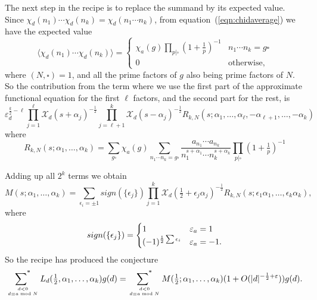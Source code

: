 \documentclass[12pt,letterpaper]{amsart}
\theoremstyle{plain}
\theoremstyle{definition}
\theoremstyle{remark}
\numberwithin{equation}{subsection}
\numberwithin{theorem}{subsection}
\numberwithin{table}{subsection}
\newcommand{\ontop}[2]{\genfrac{}{}{0pt}{}{#1}{#2}}
\def\sumstar{\operatornamewithlimits{\sum\nolimits^*}}
\begin{document}
The next step in the recipe is to replace the
summand by its expected value.  Since 
$\chi_d(n_1)\cdots \chi_d(n_k) = \chi_d(n_1\cdots n_k)$,
from equation~(\ref{eqn:chidaverage}) we have
the expected value
\begin{equation}
\langle\chi_d(n_1)\cdots \chi_d(n_k)\rangle=
\begin{cases}
    \chi_a(g) \prod_{p|\square}  (1+\frac1p)^{-1} & n_1\cdots n_k=g \square  \\
    0 & \text{otherwise},
\end{cases}
\end{equation}
where $(N,\square)=1$, and all the prime factors of $g$ also being
prime factors of $N$.
So the contribution from the term where we use the first part of the
approximate functional equation for the first $\ell$ factors,
and the second part for the rest, is
\begin{equation}
\varepsilon_d^{\frac{k}{2}-\ell}
\prod_{j=1}^\ell \mathcal{X}_d(s +\alpha_j)^{-\frac12}
\prod_{j=\ell+1}^k \mathcal{X}_d(s -\alpha_j)^{-\frac12}
R_{k,N}(s ;\alpha_1,\dots,\alpha_\ell,-\alpha_{\ell+1},\dots,-\alpha_k)
 \end{equation}
where
\begin{equation}
    R_{k,N}(s; \alpha_1,\dots,\alpha_k) =
    \sum_{g \square}
    \chi_a(g)
    \sum_{n_1\cdots n_k=g \square}
    \frac{
        a_{n_1}\cdots a_{n_k}
    }
    {n_1^{s +\alpha_1}\cdots n_k^{s+\alpha_k}}
    \prod_{p|\square} (1+\tfrac1p)^{-1}
\end{equation}

Adding up all $2^k$ terms we obtain
\begin{equation}
M(s;\alpha_1,\dots,\alpha_k) = \sum_{\epsilon_i= \pm 1}
sign(\{\epsilon_j\})
\prod_{j=1}^k \mathcal{X}_d(\tfrac12 +\epsilon_j\alpha_j)^{-\frac
12}R_{k,N}(s; \epsilon_1\alpha_1, \dots, \epsilon_k\alpha_k),
\end{equation}
where
\begin{equation}\label{eqn:sign}
sign(\{\epsilon_j\})=\begin{cases}
1 & \varepsilon_a=1 \cr
(-1)^{\frac12 \sum  \epsilon_i} & \varepsilon_a=-1 .
\end{cases}
\end{equation}
So the recipe has produced the conjecture
\begin{equation}
\sumstar_{  \ontop{d<0}{d\equiv a \bmod N}}
L_d(\tfrac12 ,\alpha_1,\dots,\alpha_k)
        g(d)
=\sumstar_{ \ontop{d<0}{d\equiv a \bmod N}}
M(\tfrac12;\alpha_1,\dots,\alpha_k)
(1+ O(|d|^{-\frac 12+\varepsilon})) g(d).
\end{equation}
\end{document}
